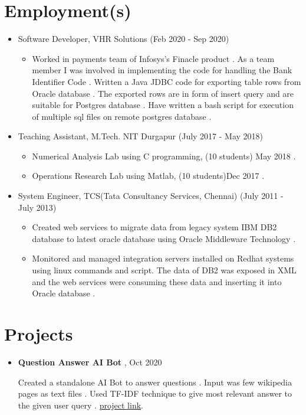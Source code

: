 \documentclass[a4paper,10pt]{article}
\begin{document}
	\section{Employment(s)}
	\begin{itemize}
	        \item Software Developer, VHR Solutions (Feb 2020 - Sep 2020)
                \begin{itemize}
                    \item Worked in payments team of Infosys’s Finacle product . As a team member I was involved in implementing the code for handling the Bank Identifier Code . Written a Java JDBC code for exporting table rows from Oracle database . The exported rows are in form of insert query and are suitable for Postgres database . Have written a bash script for execution of multiple sql files on remote postgres database .
                \end{itemize}
			\item Teaching Assistant, M.Tech. NIT Durgapur (July 2017 - May 2018)
                \begin{itemize}
                    \item Numerical Analysis Lab using C programming, (10 students) May 2018 .
                    \item Operations Research Lab using Matlab, (10 students)Dec 2017 .
                \end{itemize}
            \item System Engineer, TCS(Tata Consultancy Services, Chennai) (July 2011 - July 2013)
		        \begin{itemize}
					\item Created web services to migrate data from legacy system IBM DB2 database to latest oracle database using Oracle Middleware Technology .
					\item Monitored and managed integration servers installed on Redhat systems using linux commands and script.
					The data  of DB2 was exposed in XML  and the web services were consuming these data and inserting it into Oracle database .
			\end{itemize}
	\end{itemize}

	\section{Projects}
	
	\begin{itemize}
		\item \textbf{Question Answer AI Bot} , Oct 2020 
		
		Created a standalone AI Bot to answer questions . Input was few wikipedia pages as text files . Used TF-IDF technique to give most relevant answer to the given user query .
		\href{https://github.com/eelectron/questions}{project link}.  
	\end{itemize}
	
\end{document}
